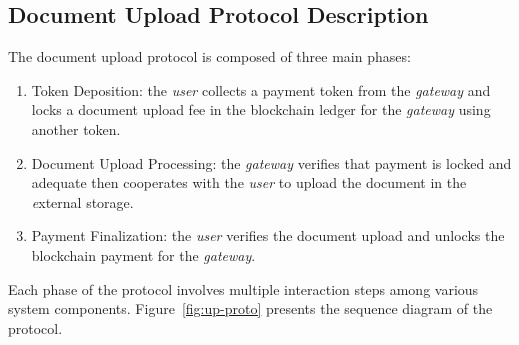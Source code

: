 \subsection{Document Upload Protocol Description}
The document upload protocol is composed of three main phases:
\begin{enumerate}
\item Token Deposition: the {\it user} collects a payment token from the {\it gateway} and locks a document upload fee in the blockchain ledger for the {\it gateway} using another token.
\item Document Upload Processing: the {\it gateway} verifies that payment is locked and adequate then cooperates with the \textit{user} to upload the document in the {\textit external storage}.
\item Payment Finalization: the {\it user} verifies the document upload and unlocks the blockchain payment for the {\it gateway}.
\end{enumerate}
Each phase of the protocol involves multiple interaction steps among various system components. Figure~\ref{fig:up-proto} presents the sequence diagram of the protocol.
